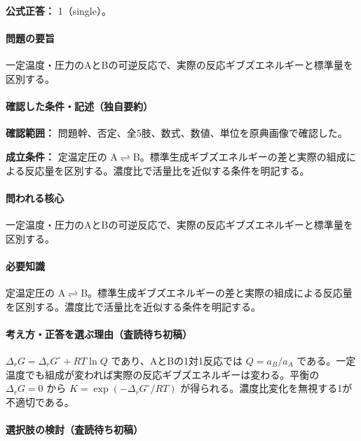 \textbf{公式正答：} 1（single）。

\paragraph{問題の要旨} 一定温度・圧力のAとBの可逆反応で、実際の反応ギブズエネルギーと標準量を区別する。

\paragraph{確認した条件・記述（独自要約）}\mbox{}\par

\noindent\textbf{確認範囲：} 問題幹、否定、全5肢、数式、数値、単位を原典画像で確認した。\par

\noindent\textbf{成立条件：} 定温定圧の \(\mathrm{A\rightleftharpoons B}\)。標準生成ギブズエネルギーの差と実際の組成による反応量を区別する。濃度比で活量比を近似する条件を明記する。\par

\paragraph{問われる核心} 一定温度・圧力のAとBの可逆反応で、実際の反応ギブズエネルギーと標準量を区別する。

\paragraph{必要知識} 定温定圧の \(\mathrm{A\rightleftharpoons B}\)。標準生成ギブズエネルギーの差と実際の組成による反応量を区別する。濃度比で活量比を近似する条件を明記する。

\paragraph{考え方・正答を選ぶ理由（査読待ち初稿）} \(\Delta_rG=\Delta_rG^\circ+RT\ln Q\) であり、AとBの1対1反応では \(Q=a_B/a_A\) である。一定温度でも組成が変われば実際の反応ギブズエネルギーは変わる。平衡の \(\Delta_rG=0\) から \(K=\exp(-\Delta_rG^\circ/RT)\) が得られる。濃度比変化を無視する1が不適切である。

\paragraph{選択肢の検討（査読待ち初稿）}\mbox{}\par

